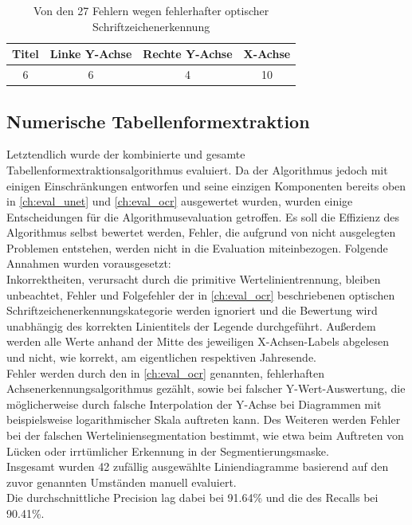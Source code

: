 \begin{table}[H]
    \centering
    \begin{tabular}{|c|c|c|c|}
        \hline
        \rowcolor[HTML]{EFEFEF}
        Titel & Linke Y-Achse & Rechte Y-Achse & X-Achse \\ \hline
        6     & 6             & 4              & 10      \\ \hline
    \end{tabular}
    \caption{Von den 27 Fehlern wegen fehlerhafter optischer Schriftzeichenerkennung}
    \label{tb:ocr2}
\end{table}

\subsection{Numerische Tabellenformextraktion}

Letztendlich wurde der kombinierte und gesamte Tabellenformextraktionsalgorithmus evaluiert. Da der Algorithmus jedoch mit einigen Einschränkungen entworfen und seine einzigen Komponenten bereits oben in \ref{ch:eval_unet} und \ref{ch:eval_ocr} ausgewertet wurden, wurden einige Entscheidungen für die Algorithmusevaluation getroffen. Es soll die Effizienz des Algorithmus selbst bewertet werden, Fehler, die aufgrund von nicht ausgelegten Problemen entstehen, werden nicht in die Evaluation miteinbezogen. Folgende Annahmen wurden vorausgesetzt:
\\
Inkorrektheiten, verursacht durch die primitive Wertelinientrennung, bleiben unbeachtet, Fehler und Folgefehler der in \ref{ch:eval_ocr} beschriebenen optischen Schriftzeichenerkennungskategorie werden ignoriert und die Bewertung wird unabhängig des korrekten Linientitels der Legende durchgeführt. Außerdem werden alle Werte anhand der Mitte des jeweiligen X-Achsen-Labels abgelesen und nicht, wie korrekt, am eigentlichen respektiven Jahresende.
\\
Fehler werden durch den in \ref{ch:eval_ocr} genannten, fehlerhaften Achsenerkennungsalgorithmus gezählt, sowie bei falscher Y-Wert-Auswertung, die möglicherweise durch falsche Interpolation der Y-Achse bei Diagrammen mit beispielsweise logarithmischer Skala auftreten kann. Des Weiteren werden Fehler bei der falschen Werteliniensegmentation bestimmt, wie etwa beim Auftreten von Lücken oder irrtümlicher Erkennung in der Segmentierungsmaske.
\\
Insgesamt wurden 42 zufällig ausgewählte Liniendiagramme basierend auf den zuvor genannten Umständen manuell evaluiert.
\\
Die durchschnittliche Precision lag dabei bei 91.64\% und die des Recalls bei 90.41\%.


